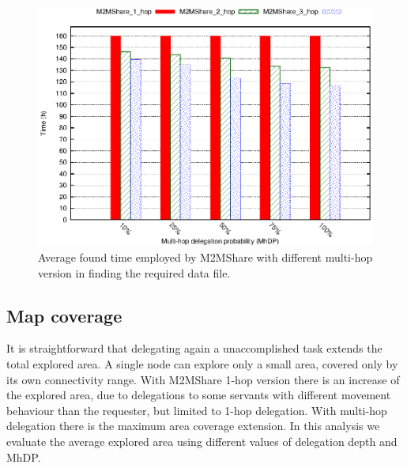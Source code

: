 \begin{figure}[htpb]
  \begin{center}
    \includegraphics{grafici/tempiVF_MultiHop.eps}
    \caption{Average found time employed by M2MShare with different multi-hop version in finding the required data file.}
    \label{fig:tempiVF_MultiHop}
  \end{center}
\end{figure}


\newpage
\subsection{Map coverage}
It is straightforward that delegating again a unaccomplished task extends the total explored area. A single node can explore only a small area, covered only by its own connectivity range. With M2MShare 1-hop version there is an increase of the explored area, due to delegations to some servants with different movement behaviour than the requester, but limited to 1-hop delegation. With multi-hop delegation there is the maximum area coverage extension. In this analysis we evaluate the average explored area using different values of delegation depth and MhDP.
\\

